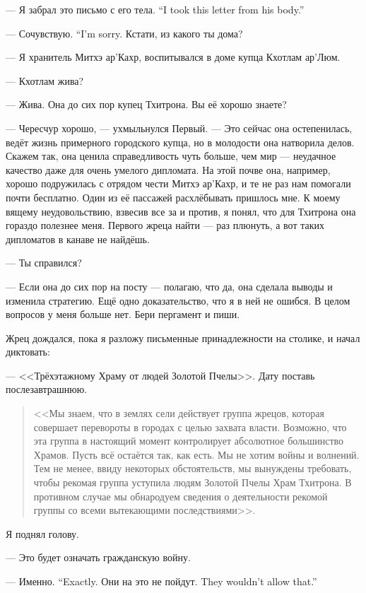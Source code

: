 {--- Я забрал это письмо с его тела.}
{``I took this letter from his body.''}

{--- Сочувствую.}
{``I'm sorry.}
Кстати, из какого ты дома?

--- Я хранитель Митхэ ар'Кахр, воспитывался в доме купца Кхотлам ар'Люм.

--- Кхотлам жива?

--- Жива.
Она до сих пор купец Тхитрона.
Вы её хорошо знаете?

--- Чересчур хорошо, --- ухмыльнулся Первый.
--- Это сейчас она остепенилась, ведёт жизнь примерного городского купца, но в молодости она натворила делов.
Скажем так, она ценила справедливость чуть больше, чем мир --- неудачное качество даже для очень умелого дипломата.
На этой почве она, например, хорошо подружилась с отрядом чести Митхэ ар'Кахр, и те не раз нам помогали почти бесплатно.
Один из её пассажей расхлёбывать пришлось мне.
К моему вящему неудовольствию, взвесив все за и против, я понял, что для Тхитрона она гораздо полезнее меня.
Первого жреца найти --- раз плюнуть, а вот таких дипломатов в канаве не найдёшь.

--- Ты справился?

--- Если она до сих пор на посту --- полагаю, что да, она сделала выводы и изменила стратегию.
Ещё одно доказательство, что я в ней не ошибся.
В целом вопросов у меня больше нет.
Бери пергамент и пиши.

Жрец дождался, пока я разложу письменные принадлежности на столике, и начал диктовать:

--- <<Трёхэтажному Храму от людей Золотой Пчелы>>.
Дату поставь послезавтрашнюю.

\begin{quote}
<<Мы знаем, что в землях сели действует группа жрецов, которая совершает перевороты в городах с целью захвата власти.
Возможно, что эта группа в настоящий момент контролирует абсолютное большинство Храмов.
Пусть всё остаётся так, как есть.
Мы не хотим войны и волнений.
Тем не менее, ввиду некоторых обстоятельств, мы вынуждены требовать, чтобы рекомая группа уступила людям Золотой Пчелы Храм Тхитрона.
В противном случае мы обнародуем сведения о деятельности рекомой группы со всеми вытекающими последствиями>>.
\end{quote}

Я поднял голову.

--- Это будет означать гражданскую войну.

{--- Именно.}
{``Exactly.}
{Они на это не пойдут.}
{They wouldn't allow that.''}

